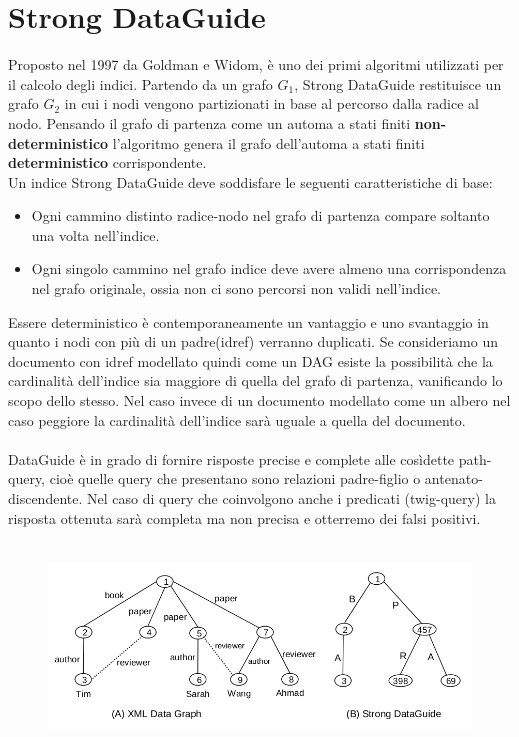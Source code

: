 \section{Strong DataGuide}
Proposto nel 1997 da Goldman e Widom, è uno dei primi algoritmi utilizzati per il calcolo degli indici. Partendo da un grafo $G_1$, Strong DataGuide restituisce un grafo $G_2$ in cui i nodi vengono partizionati in base al percorso dalla radice al nodo. Pensando il grafo di partenza come un automa a stati finiti \textbf{non-deterministico} l'algoritmo genera il grafo dell'automa a stati finiti \textbf{deterministico} corrispondente.\\
Un indice Strong DataGuide deve soddisfare le seguenti caratteristiche di base:
\begin{itemize}
\item Ogni cammino distinto radice-nodo nel grafo di partenza compare soltanto una volta nell'indice.
\item Ogni singolo cammino nel grafo indice deve avere almeno una corrispondenza nel grafo originale, ossia non ci sono percorsi non validi nell'indice.
\end{itemize}
Essere deterministico è contemporaneamente un vantaggio e uno svantaggio in quanto i nodi con più di un padre(idref) verranno duplicati. Se consideriamo un documento con idref modellato quindi come un DAG esiste la possibilità che la cardinalità dell'indice sia maggiore di quella del grafo di partenza, vanificando lo scopo dello stesso. Nel caso invece di un documento modellato come un albero nel caso peggiore la cardinalità dell'indice sarà uguale a quella del documento.\\\\
DataGuide è in grado di fornire risposte precise e complete alle cosìdette path-query, cioè quelle query che presentano sono relazioni padre-figlio o antenato-discendente. Nel caso di query che coinvolgono anche i predicati (twig-query) la risposta ottenuta sarà completa ma non precisa e otterremo dei falsi positivi.\\\\
\begin{example}
\begin{figure}[H]
\centering
\includegraphics[scale=.5]{dataguide}
\end{figure}
\end{example}
